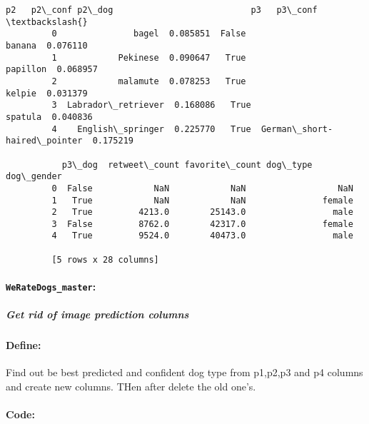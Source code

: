 \documentclass[11pt]{article}
\begin{document}
\begin{Verbatim}[commandchars=\\\{\}]
                            p2   p2\_conf p2\_dog                           p3   p3\_conf  \textbackslash{}
         0               bagel  0.085851  False                       banana  0.076110   
         1            Pekinese  0.090647   True                     papillon  0.068957   
         2            malamute  0.078253   True                       kelpie  0.031379   
         3  Labrador\_retriever  0.168086   True                      spatula  0.040836   
         4    English\_springer  0.225770   True  German\_short-haired\_pointer  0.175219   
         
           p3\_dog  retweet\_count favorite\_count dog\_type  dog\_gender  
         0  False            NaN            NaN                  NaN  
         1   True            NaN            NaN               female  
         2   True         4213.0        25143.0                 male  
         3  False         8762.0        42317.0               female  
         4   True         9524.0        40473.0                 male  
         
         [5 rows x 28 columns]
\end{Verbatim}
            
    \hypertarget{weratedogs_master}{%
\paragraph{\texorpdfstring{\texttt{WeRateDogs\_master}:}{WeRateDogs\_master:}}\label{weratedogs_master}}

\hypertarget{get-rid-of-image-prediction-columns}{%
\subparagraph{Get rid of image prediction
columns}\label{get-rid-of-image-prediction-columns}}

\hypertarget{define}{%
\paragraph{Define:}\label{define}}

Find out be best predicted and confident dog type from p1,p2,p3 and p4
columns and create new columns. THen after delete the old one's.

\hypertarget{code}{%
\paragraph{Code:}\label{code}}
\end{document}
